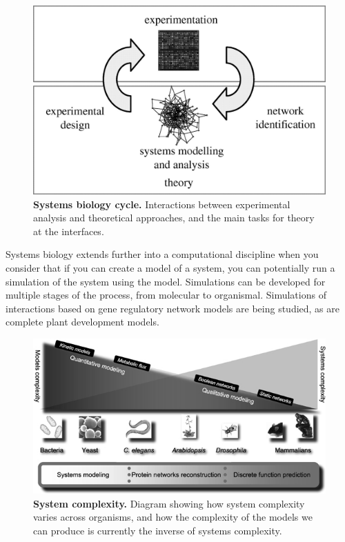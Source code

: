 \begin{figure}[tbp]
 \begin{center}
 \includegraphics[width=14cm]{./01-introduction/data/F1.png}
\end{center}
\caption[{Systems biology cycle.}]{{\bf Systems biology cycle.} Interactions between experimental analysis and theoretical approaches, and the main tasks for theory at the interfaces. \protect\citet{Doyle2006}
\label{fig:systems-biology}}
\end{figure}

Systems biology extends further into a computational discipline when you consider that if you can create a model of a system, you can potentially run a simulation of the system using the model. Simulations can be developed for multiple stages of the process, from molecular to organismal. Simulations of interactions based on gene regulatory network models are being studied\cite{Valencia2002}, as are complete plant development models\cite{Mundermann2005,Prusinkiewicz2004,Prusinkiewicz2006}.

\begin{figure}[tbp]
 \centering
 \includegraphics[width=14cm]{./01-introduction/data/msb4100080-f1.png}
\caption[{System complexity.}]{{\bf System complexity.} Diagram showing how system complexity varies across organisms, and how the complexity of the models we can produce is currently the inverse of systems complexity. \citet{Kahlem2006}
\label{fig:systems-power}}
\end{figure}

